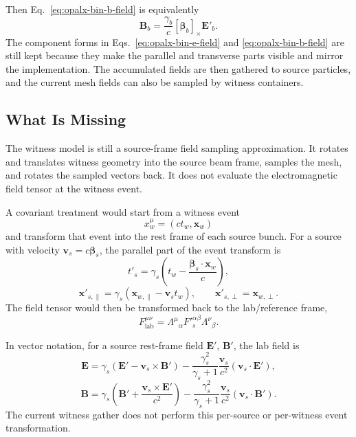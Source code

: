 \documentclass[11pt]{article}
\newcommand{\vect}[1]{\boldsymbol{#1}}
\newcommand{\E}{\vect{E}}
\newcommand{\B}{\vect{B}}
\newcommand{\betav}{\boldsymbol{\beta}}
\numberwithin{equation}{section}
\begin{document}
Then Eq.~\eqref{eq:opalx-bin-b-field} is equivalently
\begin{equation}
  \label{eq:opalx-bin-b-matrix}
  \B_b =
  \frac{\gamma_b}{c}
  [\betav_b]_\times \E'_b.
\end{equation}
The component forms in Eqs.~\eqref{eq:opalx-bin-e-field} and
\eqref{eq:opalx-bin-b-field} are still kept because they make the parallel and
transverse parts visible and mirror the implementation.
The accumulated fields are then gathered to source particles, and the current
mesh fields can also be sampled by witness containers.

\subsection{What Is Missing}

The witness model is still a source-frame field sampling approximation.  It
rotates and translates witness geometry into the source beam frame, samples the
mesh, and rotates the sampled vectors back.  It does not evaluate the
electromagnetic field tensor at the witness event.

A covariant treatment would start from a witness event
\begin{equation}
  x^\mu_w = (c t_w,\vect x_w)
\end{equation}
and transform that event into the rest frame of each source bunch.  For a source
with velocity \(\vect v_s=c\betav_s\), the parallel part of the event transform is
\begin{equation}
  t'_s =
  \gamma_s
  \left(
    t_w - \frac{\betav_s\cdot \vect x_w}{c}
  \right),
\end{equation}
\begin{equation}
  \vect x'_{s,\parallel}
  =
  \gamma_s
  \left(
    \vect x_{w,\parallel} - \vect v_s t_w
  \right),
  \qquad
  \vect x'_{s,\perp}=\vect x_{w,\perp}.
\end{equation}
The field tensor would then be transformed back to the lab/reference frame,
\begin{equation}
  F^{\mu\nu}_{\mathrm{lab}}
  =
  \Lambda^\mu{}_\alpha
  F'^{\alpha\beta}_s
  \Lambda^\nu{}_\beta .
\end{equation}

In vector notation, for a source rest-frame field \(\E'\), \(\B'\), the lab field
is
\begin{equation}
  \E =
  \gamma_s(\E' - \vect v_s\times \B')
  -
  \frac{\gamma_s^2}{\gamma_s+1}
  \frac{\vect v_s}{c^2}
  (\vect v_s\cdot \E'),
\end{equation}
\begin{equation}
  \B =
  \gamma_s\left(\B' + \frac{\vect v_s\times \E'}{c^2}\right)
  -
  \frac{\gamma_s^2}{\gamma_s+1}
  \frac{\vect v_s}{c^2}
  (\vect v_s\cdot \B').
\end{equation}
The current witness gather does not perform this per-source or per-witness event
transformation.
\end{document}
